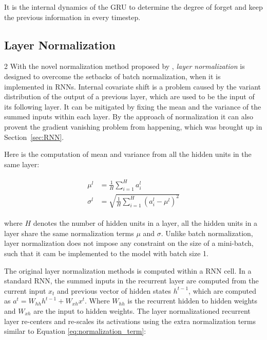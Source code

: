 It is the internal dynamics of the GRU to determine the degree of forget and keep the previous information in every timestep.

\subsection{Layer Normalization}
\label{sec:layer_norm}
\begin{multicols}{2}
With the novel normalization method proposed by \cite{ba2016layer}, \textit{layer normalization} is designed to overcome the setbacks of batch normalization, 
when it is implemented in RNNs.
Internal covariate shift is a problem caused by the variant distribution of the output of a previous layer,
which are used to be the input of its following layer.
It can be mitigated by fixing the mean and the variance of the summed inputs within each layer.
By the approach of normalization it can also provent the gradient vanishing problem from happening, which was brought up in Section~\ref{sec:RNN}.

Here is the computation of mean and variance from all the hidden units in the same layer:

\begin{align}
    \begin{split}
        \label{eq:normalization_term}
        \mu^l &= \frac{1}{H} \sum^{H}_{i=1} a^l_i \\
        \sigma^l &= \sqrt{ \frac{1}{H} \sum^H_{i=1} \left( a^l_i -\mu^l  \right)^2 }
    \end{split}
\end{align}

\noindent where $H$ denotes the number of hidden units in a layer, 
all the hidden units in a layer share the same normalization terms $\mu$ and $\sigma$.
Unlike batch normalization, 
layer normalization does not impose any constraint on the size of a mini-batch,
such that it cam be implemented to the model with batch size 1.

The original layer normalization methods is computed within a RNN cell.
In a standard RNN, 
the summed inputs in the recurrent layer are computed from the current input $x_t$ and previous vector of hidden states $h^{t-1}$, 
which are computed as $a^t = W_{hh} h^{t-1} + W_{xh} x^{t} $. 
Where $W_{hh}$ is the recurrent hidden to hidden weights and $W_{xh}$ are the input to hidden weights.
The layer normalizationed recurrent layer re-centers and re-scales its activations using the extra normalization terms similar to Equation \ref{eq:normalization_term}:


\end{multicols}
